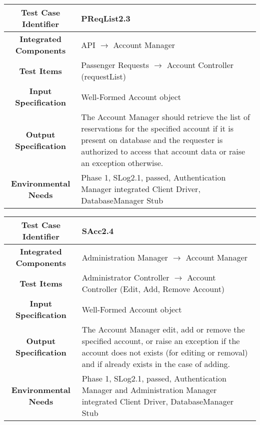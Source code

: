 \documentclass[11pt, a4paper,titlepage]{article}
\begin{document}
		 \begin{tabularx}{\textwidth}{| c|X|}
		 	\hline \textbf{Test Case Identifier} & \label{PReqList2.3}PReqList2.3 \\
		 	\hline \textbf{Integrated Components} & API $\rightarrow $ Account Manager \\
		 	\hline \textbf{Test Items} &  Passenger Requests  $\rightarrow $ Account Controller (requestList)\\
		 	\hline \textbf{Input Specification} &  Well-Formed Account object\\
		 	\hline \textbf{Output Specification} & The Account Manager should retrieve the list of reservations for the specified account if it is present on database and the requester is authorized to access that account data or raise an exception otherwise.\\
		 	\hline \textbf{Environmental Needs} &  Phase 1, SLog2.1, passed, \newline Authentication Manager integrated \newline 
		 	Client Driver, DatabaseManager Stub\\
		 	\hline
		 \end{tabularx}
		 \newline
		
		 
 		 \begin{tabularx}{\textwidth}{| c|X|}
	 		 	\hline \textbf{Test Case Identifier} & \label{SAcc2.4}SAcc2.4 \\
	 		 	\hline \textbf{Integrated Components} &  Administration Manager $\rightarrow $ Account Manager \\
	 		 	\hline \textbf{Test Items} &  Administrator Controller  $\rightarrow $ Account Controller (Edit, Add, Remove Account)\\
	 		 	\hline \textbf{Input Specification} &  Well-Formed Account object\\
	 		 	\hline \textbf{Output Specification} & The Account Manager edit, add or remove the specified account, or raise an exception if the account does not exists (for editing or removal) and if already exists in the case of adding.\\
	 		 	\hline \textbf{Environmental Needs} & Phase 1, SLog2.1, passed, \newline Authentication Manager and Administration Manager integrated \newline 
	 		 	Client Driver, DatabaseManager Stub\\
	 		 	\hline
 		 \end{tabularx}
 		 \newline
		 
\end{document}
